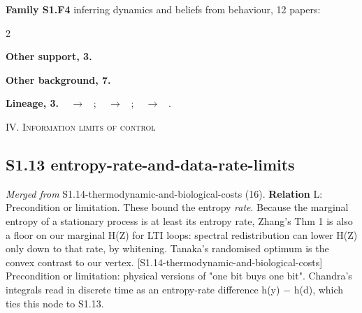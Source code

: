 \documentclass[10pt]{article}
\newcommand{\memb}[1]{\par\smallskip\textbf{#1}\quad}
\begin{document}
\memb{Family S1.F4} inferring dynamics and beliefs from behaviour, 12 papers: {\footnotesize \citetext{\citealp{Yu-joint26}; \citealp{Reddy-where18}; \citealp{Benac-bayesian24}; \citealp{Batra-optimal26}; \citealp{Letcher-inverting26}; \citealp{Herman-inverse16}; \citealp{Schmitt-see17}; \citealp{Wu-inverse18}; \citealp{Loftin-interactive19}; \citealp{Kwon-inverse20}; \citealp{Ghatrani-inverse22}; \citealp{Benac-bayesian23}}}

\begin{multicols}{2}
\memb{Other support, 3.} \citetext{\citealp{MacDermott-measuring24}; \citealp{Bellot-limits25}; \citealp{Harwood-calculating26}}

\memb{Other background, 7.} {\footnotesize \citetext{\citealp{Magnac-identifying02}; \citealp{Erkin-eliciting10}; \citealp{Jarrett-inverse23}; \citealp{James-capturing24}; \citealp{Grzeskiewicz-uncovering25}; \citealp{Virk-blind25}; \citealp{Nguyen-inverse26}}}

\end{multicols}
\memb{Lineage, 3.} {\footnotesize \citeauthor{Richens-general25}~\citeyear{Richens-general25} $\to$ \citeauthor{Batra-optimal26}~\citeyear{Batra-optimal26}; \citeauthor{Richens-general25}~\citeyear{Richens-general25} $\to$ \citeauthor{Harwood-calculating26}~\citeyear{Harwood-calculating26}; \citeauthor{Richens-general25}~\citeyear{Richens-general25} $\to$ \citeauthor{Letcher-inverting26}~\citeyear{Letcher-inverting26}.}

\medskip\textsc{IV. Information limits of control}

\subsection{S1.13 entropy-rate-and-data-rate-limits}\label{node:S1-S1-13-entropy-rate-and-data-rate-limits}
\textit{Merged from} S1.14-thermodynamic-and-biological-costs (16). \textbf{Relation} \textsf{L}: Precondition or limitation. These bound the entropy \emph{rate}. Because the marginal entropy of a stationary process is at least its entropy rate, Zhang's Thm 1 is also a floor on our marginal H(Z) for LTI loops: spectral redistribution can lower H(Z) only down to that rate, by whitening. Tanaka's randomised optimum is the convex contrast to our vertex. [S1.14-thermodynamic-and-biological-costs] Precondition or limitation: physical versions of "one bit buys one bit". Chandra's integrals read in discrete time as an entropy-rate difference h(y) \ensuremath{-} h(d), which ties this node to S1.13.
\end{document}
